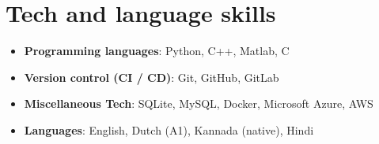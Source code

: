 \documentclass[letterpaper,12pt]{article}
\newcommand{\resumeItem}[2]{
    \item\small{
        \textbf{#1}{: #2 \vspace{-2pt}}
    }
}
\newcommand{\resumeSubItem}[2]{\resumeItem{#1}{#2}\vspace{-4pt}}
\newcommand{\resumeSubHeadingListStart}{\begin{itemize}[leftmargin=*]}
\newcommand{\resumeSubHeadingListEnd}{\end{itemize}}
\begin{document}

\section{Tech and language skills}
    \resumeSubHeadingListStart
        \resumeSubItem{Programming languages}
        {Python, C++, Matlab, C}
        \resumeSubItem{Version control (CI / CD)}
        {Git, GitHub, GitLab}
        \resumeSubItem{Miscellaneous Tech}
        {SQLite, MySQL, Docker, Microsoft Azure, AWS}
        \resumeSubItem{Languages}
        {English, Dutch (A1), Kannada (native), Hindi}
    \resumeSubHeadingListEnd
\end{document}
